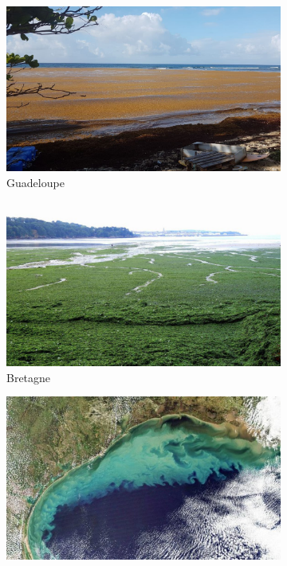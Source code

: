\documentclass[../thesis.tex]{subfiles}
\begin{document}
\begin{figure}[H]
        \begin{subfigure}{.3\textwidth}
            \centering
            \includegraphics[width=\linewidth]{img/intro/intro-limites-sargas} \\
            \scriptsize Guadeloupe
        \end{subfigure}
        \hfill
        \begin{subfigure}{.3\textwidth}
            \centering
            \includegraphics[width=\linewidth]{img/intro/intro-limites-algues-vertes} \\
            \scriptsize Bretagne
        \end{subfigure}
        \hfill
        \begin{subfigure}{.3\textwidth}
            \centering
            \includegraphics[width=\linewidth]{img/intro/intro-limites-zone-norte} \\

\end{subfigure}
\end{figure}
\end{document}
